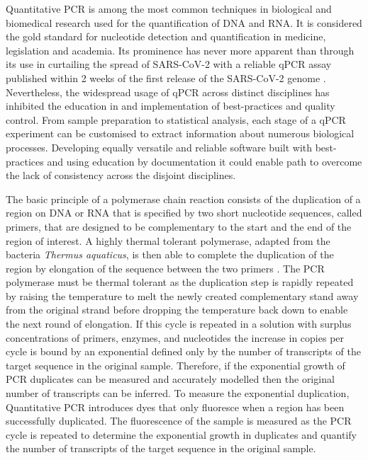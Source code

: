\documentclass{SBCbookchapter}
\begin{document}
Quantitative PCR is among the most common techniques in biological and biomedical research used for the quantification of DNA and RNA. It is considered the gold standard for nucleotide detection and quantification in medicine, legislation and academia. Its prominence has never more apparent than through its use in curtailing the spread of SARS-CoV-2 with a reliable qPCR assay published within 2 weeks of the first release of the SARS-CoV-2 genome \cite{Li2020}. Nevertheless, the widespread usage of qPCR across distinct disciplines has inhibited the education in and implementation of best-practices and quality control. \cite{Bustin2021} From sample preparation to statistical analysis, each stage of a qPCR experiment can be customised to extract information about numerous biological processes. Developing equally versatile and reliable software built with best-practices and using education by documentation it could enable path to overcome the lack of consistency across the disjoint disciplines. 

The basic principle of a polymerase chain reaction consists of the duplication of a region on DNA or RNA that is specified by two short nucleotide sequences, called primers, that are designed to be complementary to the start and the end of the region of interest. A highly thermal tolerant polymerase, adapted from the bacteria \textit{Thermus aquaticus}, is then able to complete the duplication of the region by elongation of the sequence between the two primers \cite{Holland1991}. The PCR polymerase must be thermal tolerant as the duplication step is rapidly repeated by raising the temperature to melt the newly created complementary stand away from the original strand before dropping the temperature back down to enable the next round of elongation. If this cycle is repeated in a solution with surplus concentrations of primers, enzymes, and nucleotides the increase in copies per cycle is bound by an exponential defined only by the number of transcripts of the target sequence in the original sample. Therefore, if the exponential growth of PCR duplicates can be measured and accurately modelled then the original number of transcripts can be inferred. To measure the exponential duplication, Quantitative PCR introduces dyes that only fluoresce when a region has been successfully duplicated. The fluorescence of the sample is measured as the PCR cycle is repeated to determine the exponential growth in duplicates and quantify the number of transcripts of the target sequence in the original sample.
\end{document}

